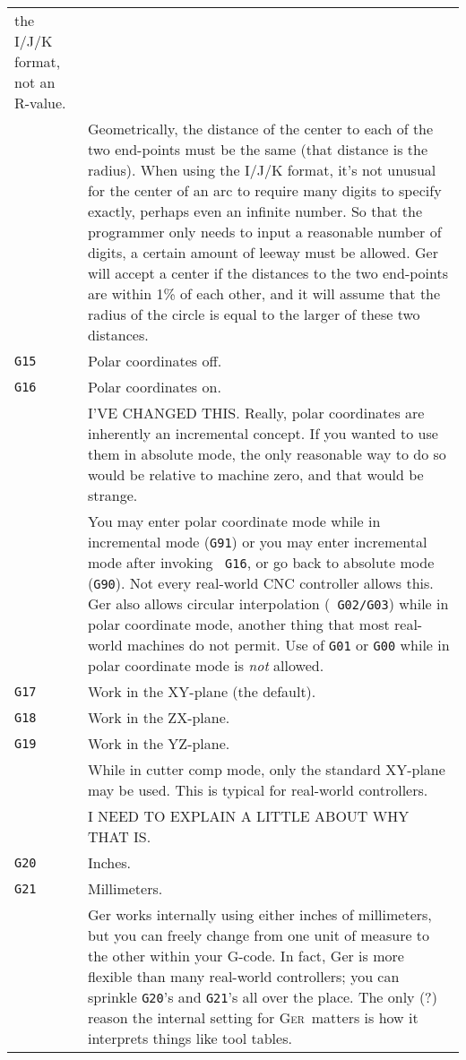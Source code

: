 \documentclass[titlepage,oneside,10pt]{article}
\newcommand{\ger}{\textsc{Ger}}
\begin{document}
\begin{longtable}{lp{10cm}}
the I/J/K format, not an R-value.\\
&Geometrically, the distance of the center to each of the two
end-points must be the same (that distance is the radius). When using
the I/J/K format, it's not unusual for the center of an arc to require
many digits to specify exactly, perhaps even an infinite number. So
that the programmer only needs to input a reasonable number of digits,
a certain amount of leeway must be allowed. Ger will accept a center
if the distances to the two end-points are within 1\% of each other,
and it will assume that the radius of the circle is equal to the
larger of these two distances.\\
{\tt G15}&Polar coordinates off.\\
{\tt G16}&Polar coordinates on. \\
& I'VE CHANGED THIS. Really, polar coordinates are inherently an
incremental concept. If you wanted to use them in absolute mode, the
only reasonable way to do so would be relative to machine zero, and
that would be strange.\\
&You may enter polar coordinate mode while in incremental mode
({\tt G91}) or you may enter incremental mode after invoking {\tt
  G16}, or go back to absolute mode ({\tt G90}). Not every real-world CNC
controller allows this. Ger also allows circular interpolation ({\tt
  G02/G03}) while in polar coordinate mode, another thing that most
real-world machines do not permit. Use of {\tt G01} or {\tt G00} while
in polar coordinate mode is \emph{not} allowed.\\ 
{\tt G17}& Work in the XY-plane (the default).\\
{\tt G18}& Work in the ZX-plane.\\
{\tt G19}& Work in the YZ-plane.\\
& While in cutter comp mode, only the standard XY-plane may be
used. This is typical for real-world controllers.\\
& I NEED TO EXPLAIN A LITTLE ABOUT WHY THAT IS.\\
{\tt G20}&Inches.\\
{\tt G21}&Millimeters.\\
& Ger works internally using either inches of millimeters, but you can
freely change from one unit of measure to the other within your
G-code. In fact, Ger is more flexible than many real-world
controllers; you can sprinkle {\tt G20}'s and {\tt G21}'s all over the
place. The only (?) reason the internal setting for \ger\ matters is
how it interprets things like tool tables. \\  

\end{longtable}
\end{document}
